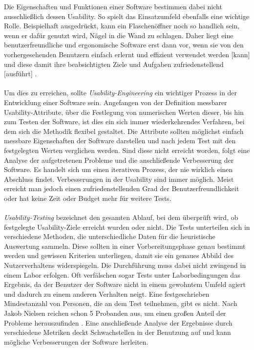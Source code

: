 Die Eigenschaften und Funktionen einer Software bestimmen dabei nicht ausschließlich dessen Usability. So spielt das Einsatzumfeld ebenfalls eine wichtige Rolle. Beispielhaft ausgedrückt, kann ein Flaschenöffner noch so handlich sein, wenn er dafür genutzt wird, Nägel in die Wand zu schlagen. Daher liegt eine benutzerfreundliche und ergonomische Software erst dann vor, wenn \glqq sie von den vorhergesehenden Benutzern einfach erlernt und effizient verwendet werden [kann] und diese damit ihre beabsichtigten Ziele und Aufgaben zufriedenstellend [ausführt]\grqq{} \cite{UsabilityKompakt}.\\
\\
Um dies zu erreichen, sollte \textit{Usability-Engineering} ein wichtiger Prozess in der Entwicklung einer Software sein. Angefangen von der Definition messbarer Usability-Attribute, über die Festlegung von numerischen Werten dieser, bis hin zum Testen der Software, ist dies ein sich immer wiederkehrendes Verfahren, bei dem sich die Methodik flexibel gestaltet. Die Attribute sollten möglichst einfach messbare Eigenschaften der Software darstellen und nach jedem Test mit den festgelegten Werten verglichen werden. Sind diese nicht erreicht worden, folgt eine Analyse der aufgetretenen Probleme und die anschließende Verbesserung der Software. Es handelt sich um einen iterativen Prozess, der nie wirklich einen Abschluss findet. Verbesserungen in der Usability sind immer möglich. Meist erreicht man jedoch einen zufriedenstellenden Grad der Benutzerfreundlichkeit oder hat keine Zeit oder Budget mehr für weitere Tests.\\
\\
\textit{Usability-Testing} bezeichnet den gesamten Ablauf, bei dem überprüft wird, ob festgelegte Usability-Ziele erreicht wurden oder nicht. Die Tests unterteilen sich in verschiedene Methoden, die unterschiedliche Daten für die heuristische Auswertung sammeln. Diese sollten in einer Vorbereitungsphase genau bestimmt werden und gewissen Kriterien unterliegen, damit sie ein genaues Abbild des Nutzerverhaltens widerspiegeln. Die Durchführung muss dabei nicht zwingend in einem Labor erfolgen. Oft verfälschen sogar Tests unter Laborbedingungen das Ergebnis, da der Benutzer der Software nicht in einem gewohntem Umfeld agiert und dadurch zu einem anderen Verhalten neigt. Eine festgeschrieben Mindestanzahl von Personen, die an dem Test teilnehmen, gibt es nicht. Nach Jakob Nielsen reichen schon 5 Probanden aus, um einen großen Anteil der Probleme herauszufinden \cite{anzahlTestpersonen}. Eine anschließende Analyse der Ergebnisse durch verschiedene Metriken deckt Schwachstellen in der Benutzung auf und kann mögliche Verbesserungen der Software herleiten.\\
